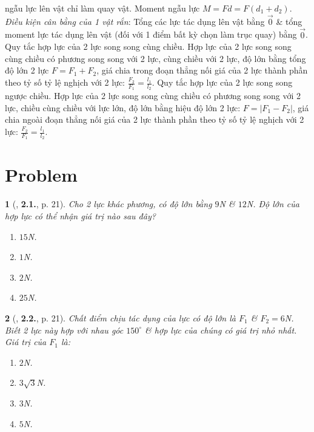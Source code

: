 \documentclass{article}
\newtheorem{baitoan}{}
\begin{document}
ngẫu lực lên vật chỉ làm quay vật. Moment ngẫu lực $M = Fd = F(d_1 + d_2)$. {\it Điều kiện cân bằng của 1 vật rắn}: Tổng các lực tác dụng lên vật bằng $\vec{0}$ \& tổng moment lực tác dụng lên vật (đối với 1 điểm bất kỳ chọn làm trục quay) bằng $\vec{0}$.  {\sf Quy tắc hợp lực của 2 lực song song cùng chiều.} Hợp lực của 2 lực song song cùng chiều có phương song song với 2 lực, cùng chiều với 2 lực, độ lớn bằng tổng độ lớn 2 lực $F = F_1 + F_2$, giá chia trong đoạn thẳng nối giá của 2 lực thành phần theo tỷ số tỷ lệ nghịch với 2 lực: $\frac{F_2}{F_1} = \frac{l_1}{l_2}$.  {\sf Quy tắc hợp lực của 2 lực song song ngược chiều.} Hợp lực của 2 lực song song cùng chiều có phương song song với 2 lực, chiều cùng chiều với lực lớn, độ lớn bằng hiệu độ lớn 2 lực: $F = |F_1 - F_2|$, giá chia ngoài đoạn thẳng nối giá của 2 lực thành phần theo tỷ số tỷ lệ nghịch với 2 lực: $\frac{F_2}{F_1} = \frac{l_1}{l_2}$.


\section{Problem}

\begin{baitoan}[\cite{Giang_Hang_Trung_ncpt_Vat_Ly_10}, \textbf{2.1.}, p. 21]
	Cho 2 lực khác phương, có độ lớn bằng $9$\emph{N} \& $12$\emph{N}. Độ lớn của hợp lực có thể nhận giá trị nào sau đây?
	\begin{enumerate}
		\item[{\rm\sf A.}] $15$\emph{N}.
		\item[{\rm\sf B.}] $1$\emph{N}.
		\item[{\rm\sf C.}] $2$\emph{N}.
		\item[{\rm\sf D.}] $25$\emph{N}.
	\end{enumerate}
\end{baitoan}

\begin{baitoan}[\cite{Giang_Hang_Trung_ncpt_Vat_Ly_10}, \textbf{2.2.}, p. 21]
	Chất điểm chịu tác dụng của lực có độ lớn là $F_1$ \& $F_2 = 6$\emph{N}. Biết 2 lực này hợp với nhau góc $150^\circ$ \& hợp lực của chúng có giá trị nhỏ nhất. Giá trị của $F_1$ là: 
	\begin{enumerate}
		\item[{\rm\sf A.}] $2$\emph{N}.
		\item[{\rm\sf B.}] $3\sqrt{3}$\emph{N}.
		\item[{\rm\sf C.}] $3$\emph{N}.
		\item[{\rm\sf D.}] $5$\emph{N}.
	\end{enumerate}
\end{baitoan}


\printbibliography[heading=bibintoc]
	
\end{document}
